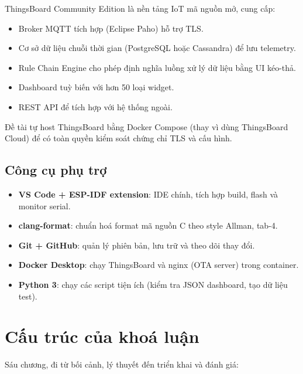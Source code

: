 ThingsBoard Community Edition là nền tảng IoT mã nguồn mở, cung cấp:

\begin{itemize}
    \item Broker MQTT tích hợp (Eclipse Paho) hỗ trợ TLS.
    \item Cơ sở dữ liệu chuỗi thời gian (PostgreSQL hoặc Cassandra) để lưu telemetry.
    \item Rule Chain Engine cho phép định nghĩa luồng xử lý dữ liệu bằng UI kéo-thả.
    \item Dashboard tuỳ biến với hơn 50 loại widget.
    \item REST API để tích hợp với hệ thống ngoài.
\end{itemize}

Đề tài tự host ThingsBoard bằng Docker Compose (thay vì dùng ThingsBoard Cloud) để có toàn quyền kiểm soát chứng chỉ TLS và cấu hình.

\subsection{Công cụ phụ trợ}

\begin{itemize}
    \item \textbf{VS Code + ESP-IDF extension}: IDE chính, tích hợp build, flash và monitor serial.
    \item \textbf{clang-format}: chuẩn hoá format mã nguồn C theo style Allman, tab-4.
    \item \textbf{Git + GitHub}: quản lý phiên bản, lưu trữ và theo dõi thay đổi.
    \item \textbf{Docker Desktop}: chạy ThingsBoard và nginx (OTA server) trong container.
    \item \textbf{Python 3}: chạy các script tiện ích (kiểm tra JSON dashboard, tạo dữ liệu test).
\end{itemize}

\section{Cấu trúc của khoá luận}

Sáu chương, đi từ bối cảnh, lý thuyết đến triển khai và đánh giá:

